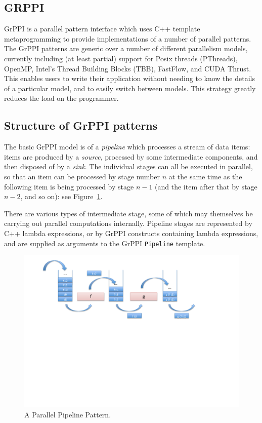 \subsection{GRPPI}

GrPPI\cite{D24,DBLP:journals/concurrency/AstorgaD0G17} is a parallel pattern interface
which uses C++ template metaprogramming to provide implementations of
a number of parallel patterns.  The GrPPI patterns are generic over a
number of different parallelism models, currently including (at least
partial) support for Posix threads (PThreads), OpenMP, Intel's Thread Building Blocks (TBB), FastFlow, and
CUDA Thrust.  This enables users to write their application without
needing to know the details of a particular model, and to easily
switch between models.  This strategy greatly reduces the load on the programmer.


\subsection{Structure of GrPPI patterns}\label{sec:pattern-structure}

The basic GrPPI model is of a \textit{pipeline} which processes a
stream of data items: items are produced by a \textit{source},
processed by some intermediate components, and then disposed of by a
\textit{sink}. The individual stages can all be executed in parallel,
so that an item can be processed by stage number $n$ at the same time
as the following item is being processed by stage $n-1$ (and the item
after that by stage $n-2$, and so on): see Figure~\ref{pipeline1}.  

There are various types of
intermediate stage, some of which may themselves be carrying out
parallel computations internally.  Pipeline stages are represented by C++
lambda expressions, or by GrPPI constructs containing lambda expressions,
and are supplied as arguments to the GrPPI \texttt{Pipeline} template.

\begin{figure}[!ht]
\includegraphics[width=12cm]{figures/pipeline.pdf}

\caption{A Parallel Pipeline Pattern.}
\label{pipeline1}
\end{figure}


